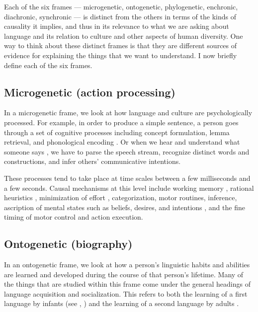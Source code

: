 Each of the six frames --- microgenetic, ontogenetic, phylogenetic, 
enchronic, diachronic, synchronic --- is distinct from the others in terms 
of the kinds of causality it implies, and thus in its relevance to what 
we are asking about language and its relation to culture and other 
aspects of human diversity. One way to think about these distinct frames 
is that they are different sources of evidence for explaining the things 
that we want to understand. I now briefly define each of the six frames.



\subsection{Microgenetic (action processing)}


In a microgenetic frame, we look at how language and culture are psychologically processed. For example, in order to produce a simple sentence, a person goes through a set of 
cognitive processes including concept formulation, lemma retrieval, and phonological 
encoding \citep{levelt_speaking:_1989}. Or when we hear and understand what someone says \citep{cutler_native_2012}, we have to parse the 
speech stream, recognize distinct words and constructions, and infer 
others' communicative intentions. 

These processes tend to take place at time scales between a few 
milliseconds and a few seconds. Causal mechanisms at this 
level include working memory \citep{baddeley_working_1986}, rational 
heuristics \citep{gigerenzer_heuristics:_2011}, minimization of
effort \citep{zipf_human_1949}, categorization, motor routines, 
inference, ascription of mental states such as beliefs, 
desires, and intentions \citep{searle_intentionality:_1983,enfield_roots_2006}, and 
the fine timing of motor control and action execution.



\subsection{Ontogenetic (biography)}


In an ontogenetic frame, we look at how a 
person's linguistic habits and abilities are learned and
developed during the course of that person's lifetime. Many of the 
things that are studied within this frame come under the general 
headings of language acquisition and socialization. This refers to both
the learning of a first language by infants (see \citealt{clark_first_2009}, \citealt{brown_language_2014}) and the learning of a second 
language by adults \citep{klein_second_1986}. 



